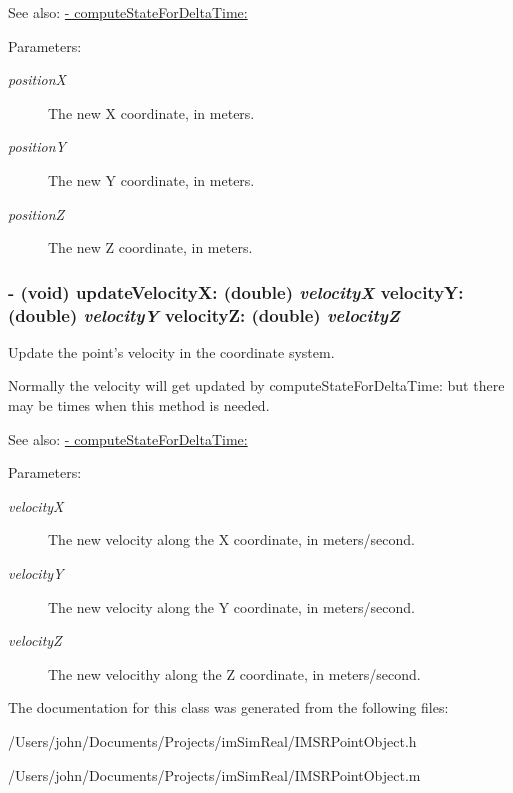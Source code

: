 \begin{Desc}
\item[See also:]\hyperlink{interface_i_m_s_r_point_object_ae14396d83b2edd2f34b0bfb0f35a501}{- computeStateForDeltaTime:}\end{Desc}
\begin{Desc}
\item[Parameters:]
\begin{description}
\item[{\em positionX}]The new X coordinate, in meters. \item[{\em positionY}]The new Y coordinate, in meters. \item[{\em positionZ}]The new Z coordinate, in meters. \end{description}
\end{Desc}
\hypertarget{interface_i_m_s_r_point_object_55fbe7e8642006b44ebeedc850b5c728}{
\subsubsection[{updateVelocityX:velocityY:velocityZ:}]{\setlength{\rightskip}{0pt plus 5cm}- (void) updateVelocityX: (double) {\em velocityX}\/ velocityY: (double) {\em velocityY}\/ velocityZ: (double) {\em velocityZ}}}
\label{interface_i_m_s_r_point_object_55fbe7e8642006b44ebeedc850b5c728}


Update the point's velocity in the coordinate system. 

Normally the velocity will get updated by computeStateForDeltaTime: but there may be times when this method is needed.

\begin{Desc}
\item[See also:]\hyperlink{interface_i_m_s_r_point_object_ae14396d83b2edd2f34b0bfb0f35a501}{- computeStateForDeltaTime:}\end{Desc}
\begin{Desc}
\item[Parameters:]
\begin{description}
\item[{\em velocityX}]The new velocity along the X coordinate, in meters/second. \item[{\em velocityY}]The new velocity along the Y coordinate, in meters/second. \item[{\em velocityZ}]The new velocithy along the Z coordinate, in meters/second. \end{description}
\end{Desc}


The documentation for this class was generated from the following files:\begin{CompactItemize}
\item 
/Users/john/Documents/Projects/imSimReal/IMSRPointObject.h\item 
/Users/john/Documents/Projects/imSimReal/IMSRPointObject.m\end{CompactItemize}
